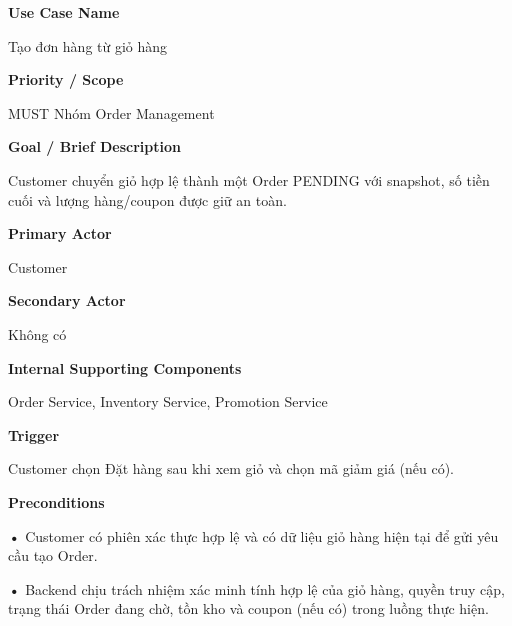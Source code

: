 \documentclass[11pt,a4paper,oneside]{report}
\begin{document}
\par\smallskip\noindent\textcolor{sgublue}{\textbf{Use Case Name}}\par\nobreak
Tạo đơn hàng từ giỏ hàng
\par

\par\smallskip\noindent\textcolor{sgublue}{\textbf{Priority / Scope}}\par\nobreak
MUST \textbar{} Nhóm Order Management
\par

\par\smallskip\noindent\textcolor{sgublue}{\textbf{Goal / Brief Description}}\par\nobreak
Customer chuyển giỏ hợp lệ thành một Order PENDING với snapshot, số tiền cuối và lượng hàng/coupon được giữ an toàn.
\par

\par\smallskip\noindent\textcolor{sgublue}{\textbf{Primary Actor}}\par\nobreak
Customer
\par

\par\smallskip\noindent\textcolor{sgublue}{\textbf{Secondary Actor}}\par\nobreak
Không có
\par

\par\smallskip\noindent\textcolor{sgublue}{\textbf{Internal Supporting Components}}\par\nobreak
Order Service, Inventory Service, Promotion Service
\par

\par\smallskip\noindent\textcolor{sgublue}{\textbf{Trigger}}\par\nobreak
Customer chọn Đặt hàng sau khi xem giỏ và chọn mã giảm giá (nếu có).
\par

\par\smallskip\noindent\textcolor{sgublue}{\textbf{Preconditions}}\par\nobreak
\textbf{•} Customer có phiên xác thực hợp lệ và có dữ liệu giỏ hàng hiện tại để gửi yêu cầu tạo Order.

\textbf{•} Backend chịu trách nhiệm xác minh tính hợp lệ của giỏ hàng, quyền truy cập, trạng thái Order đang chờ, tồn kho và coupon (nếu có) trong luồng thực hiện.
\par
\end{document}
